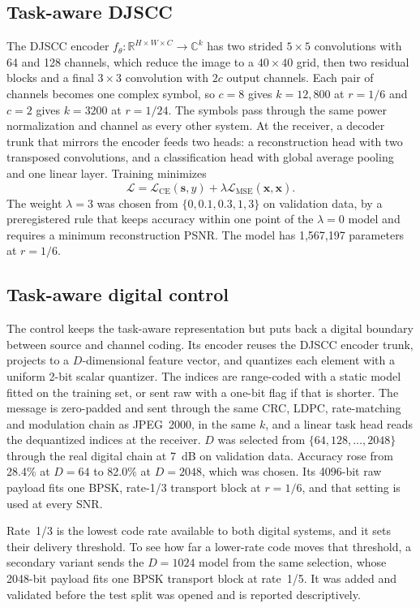 \documentclass[conference]{IEEEtran}
\begin{document}
\subsection{Task-aware DJSCC}
The DJSCC encoder $f_{\theta}:\mathbb{R}^{H\times W\times C}\rightarrow\mathbb{C}^{k}$ has two strided $5\times5$ convolutions with 64 and 128 channels, which reduce the image to a $40\times40$ grid, then two residual blocks and a final $3\times3$ convolution with $2c$ output channels. Each pair of channels becomes one complex symbol, so $c=8$ gives $k=12{,}800$ at $r=1/6$ and $c=2$ gives $k=3200$ at $r=1/24$. The symbols pass through the same power normalization and channel as every other system. At the receiver, a decoder trunk that mirrors the encoder feeds two heads: a reconstruction head with two transposed convolutions, and a classification head with global average pooling and one linear layer. Training minimizes
\begin{equation}
 \mathcal{L}=\mathcal{L}_{\mathrm{CE}}(\mathbf{s},y)+\lambda\mathcal{L}_{\mathrm{MSE}}(\hat{\mathbf{x}},\mathbf{x}).
\end{equation}
The weight $\lambda=3$ was chosen from $\{0,0.1,0.3,1,3\}$ on validation data, by a preregistered rule that keeps accuracy within one point of the $\lambda=0$ model and requires a minimum reconstruction PSNR. The model has 1,567,197 parameters at $r=1/6$.

\subsection{Task-aware digital control}
The control keeps the task-aware representation but puts back a digital boundary between source and channel coding. Its encoder reuses the DJSCC encoder trunk, projects to a $D$-dimensional feature vector, and quantizes each element with a uniform 2-bit scalar quantizer. The indices are range-coded with a static model fitted on the training set, or sent raw with a one-bit flag if that is shorter. The message is zero-padded and sent through the same CRC, LDPC, rate-matching and modulation chain as JPEG~2000, in the same $k$, and a linear task head reads the dequantized indices at the receiver. $D$ was selected from $\{64,128,\ldots,2048\}$ through the real digital chain at 7~dB on validation data. Accuracy rose from 28.4\% at $D=64$ to 82.0\% at $D=2048$, which was chosen. Its 4096-bit raw payload fits one BPSK, rate-1/3 transport block at $r=1/6$, and that setting is used at every SNR.

Rate~1/3 is the lowest code rate available to both digital systems, and it sets their delivery threshold. To see how far a lower-rate code moves that threshold, a secondary variant sends the $D=1024$ model from the same selection, whose 2048-bit payload fits one BPSK transport block at rate~1/5. It was added and validated before the test split was opened and is reported descriptively.
\end{document}
